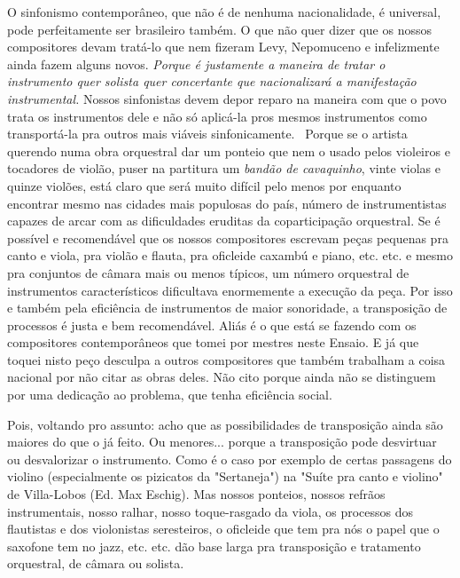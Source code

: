 O sinfonismo contemporâneo, que não é de nenhuma nacionalidade, é
universal, pode perfeitamente ser brasileiro também. O que não quer
dizer que os nossos compositores devam tratá-lo que nem fizeram Levy,
Nepomuceno e infelizmente ainda fazem alguns novos. \emph{Porque é
justamente a maneira de tratar o instrumento quer solista quer
concertante que nacionalizará a manifestação instrumental.} Nossos
sinfonistas devem depor reparo na maneira com que o povo trata os
instrumentos dele e não só aplicá-la pros mesmos instrumentos como
transportá-la pra outros mais viáveis sinfonicamente.~ Porque se o
artista querendo numa obra orquestral dar um ponteio que nem o usado
pelos violeiros e tocadores de violão, puser na partitura um
\emph{bandão de cavaquinho}, vinte violas e quinze violões, está claro
que será muito difícil pelo menos por enquanto encontrar mesmo nas
cidades mais populosas do país, número de instrumentistas capazes de
arcar com as dificuldades eruditas da coparticipação orquestral. Se é
possível e recomendável que os nossos compositores escrevam peças
pequenas pra canto e viola, pra violão e flauta, pra oficleide caxambú e
piano, etc. etc. e mesmo pra conjuntos de câmara mais ou menos típicos,
um número orquestral de instrumentos característicos dificultava
enormemente a execução da peça. Por isso e também pela eficiência de
instrumentos de maior sonoridade, a transposição de processos é justa e
bem recomendável. Aliás é o que está se fazendo com os compositores
contemporâneos que tomei por mestres neste Ensaio. E já que toquei nisto
peço desculpa a outros compositores que também trabalham a coisa
nacional por não citar as obras deles. Não cito porque ainda não se
distinguem por uma dedicação ao problema, que tenha eficiência social.~

Pois, voltando pro assunto: acho que as possibilidades de transposição
ainda são maiores do que o já feito. Ou menores... porque a transposição
pode desvirtuar ou desvalorizar o instrumento. Como é o caso por exemplo
de certas passagens do violino (especialmente os pizicatos da
"Sertaneja") na "Suíte pra canto e violino" de Villa-Lobos (Ed. Max
Eschig). Mas nossos ponteios, nossos refrãos instrumentais, nosso
ralhar, nosso toque-rasgado da viola, os processos dos flautistas e dos
violonistas seresteiros, o oficleide que tem pra nós o papel que o
saxofone tem no jazz, etc. etc. dão base larga pra transposição e
tratamento orquestral, de câmara ou solista.

